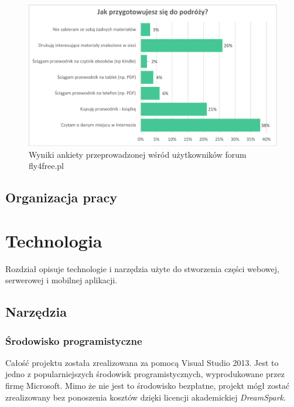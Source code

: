 \documentclass[a4paper]{book}
\begin{document}
			\begin{figure}		
				\centering
				\includegraphics[width=1.0\textwidth]{images/fly4freeAnkieta.pdf}
				\caption{Wyniki ankiety przeprowadzonej wśród użytkowników forum fly4free.pl}
				\label{fig:fly4freeAnkieta}
			\end{figure}
		
			\section{Organizacja pracy}
		
	
	
	
	\chapter{Technologia}
	\label{id:cha:technologia}
	
	Rozdział opisuje technologie i narzędzia użyte do stworzenia części webowej, serwerowej i mobilnej aplikacji.
	
		\section{Narzędzia}		
			\subsection{Środowisko programistyczne}
				
			Całość projektu została zrealizowana za pomocą Visual Studio 2013. Jest to jedno z popularniejszych środowisk programistycznych, wyprodukowane przez firmę Microsoft. Mimo że nie jest to środowisko bezpłatne, projekt mógł zostać zrealizowany bez ponoszenia kosztów dzięki licencji akademickiej \textit{DreamSpark}. 
			
\end{document}
